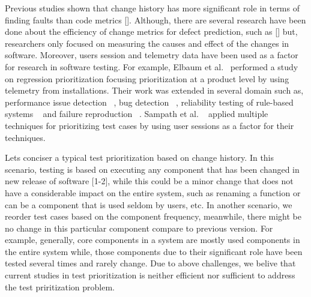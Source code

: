 Previous studies shown that change history has more significant role in 
terms of finding faults than code metrics []. 
Although, there are several research have been done about the efficiency of 
change metrics for defect prediction, such as [] but, researchers only focused on 
measuring the causes and effect of the changes in software. 
Moreover, users session and telemetry data 
have been used as a factor for research in software testing. 
For example, Elbaum et al.~\cite{elbaum2005profiling} performed a study on regression 
prioritization focusing prioritization at a product level 
by using telemetry from installations. 
Their work was extended in several domain such as, performance issue detection ~\cite{parsons2007automatic},
bug detection ~\cite{wang2008approach}, reliability testing of rule-based 
systems ~\cite{avritzer1996reliability} and failure reproduction ~\cite{jin2012bugredux}. 
Sampath et al. ~\cite{Sampath2008} applied multiple techniques for prioritizing test cases 
by using user sessions as a factor for their techniques. 


Lets conciser a typical test prioritization based on change history. 
In this scenario, testing is based on executing any component that has been 
changed in new release of software [1-2], %
while this could be a minor change that 
does not have a considerable impact on the entire system, 
such as renaming a function or can be a 
component that is used seldom by users, etc. 
In another scenario, we reorder test cases based on the component frequency, 
meanwhile, there might be no change in this particular component compare to previous version.
For example, generally, core components in a system are mostly used components in the entire system 
while, those components due to their significant role have been tested several times and rarely change. 
Due to above challenges, we belive that current studies in test prioritization 
is neither efficient nor sufficient to address the test priritization problem. 



